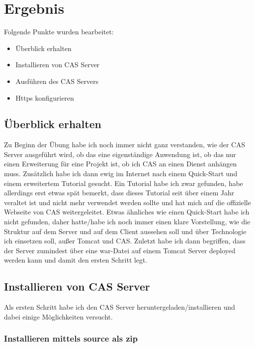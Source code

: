 
\section{Ergebnis}
\label{sec:Ergebnis}

Folgende Punkte wurden bearbeitet:

\begin{itemize}
	\item Überblick erhalten
	\item Installieren von CAS Server
	\item Ausführen des CAS Servers
	\item Https konfigurieren
\end{itemize}

\subsection{Überblick erhalten}

Zu Beginn der Übung habe ich noch immer nicht ganz verstanden, wie der CAS Server ausgeführt wird, ob das eine eigenständige Anwendung ist, ob das nur einen Erweiterung für eine Projekt ist, ob ich CAS an einen Dienst anhängen muss.
\newline
Zusätzlich habe ich dann ewig im Internet nach einem Quick-Start und einem erweitertem Tutorial gesucht. Ein Tutorial habe ich zwar gefunden, habe allerdings erst etwas spät bemerkt, dass dieses Tutorial seit über einem Jahr veraltet ist und nicht mehr verwendet werden sollte und hat mich auf die offizielle Webseite von CAS weitergeleitet. Etwas ähnliches wie einen Quick-Start habe ich nicht gefunden, daher hatte/habe ich noch immer einen klare Vorstellung, wie die Struktur auf dem Server und auf dem Client aussehen soll und über Technologie ich einsetzen soll, außer Tomcat und CAS.
\newline 
Zuletzt habe ich dann begriffen, dass der Server zumindest über eine war-Datei auf einem Tomcat Server deployed werden kann und damit den ersten Schritt legt.

\subsection{Installieren von CAS Server}

Als ersten Schritt habe ich den CAS Server heruntergeladen/installieren und dabei einige Möglichkeiten versucht.

\subsubsection{Installieren mittels source als zip}

